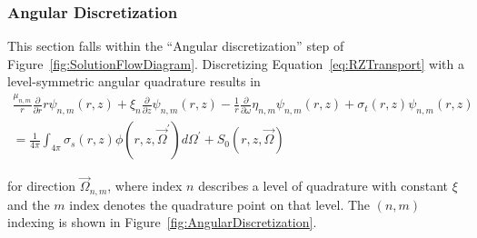 \documentclass[12pt]{article}
\begin{document}
\subsubsection{Angular Discretization}
\label{sec:RZAngularDiscretization}
This section falls within the ``Angular discretization'' step of Figure~\ref{fig:SolutionFlowDiagram}. Discretizing Equation~\ref{eq:RZTransport} with a level-symmetric angular quadrature results in 
\begin{multline}
\frac{\mu_{n,m}}{r} \frac{\partial}{\partial r} r \psi_{n,m} \left(r,z \right) + \xi_n \frac{\partial}{\partial z} \psi_{n,m} \left(r,z \right) - \frac{1}{r} \frac{\partial}{\partial \omega} \eta_{n,m} \psi_{n,m} \left(r,z \right) + \sigma_t \left(r,z \right) \psi_{n,m} \left(r,z \right) \\
= \frac{1}{4 \pi} \int_{4 \pi} \sigma_s \left(r,z \right) \phi \left(r,z, \vec{\Omega}^\prime \right) d \Omega^\prime + S_0 \left(r,z, \vec{\Omega} \right)
\label{eq:RZSNTransport}
\end{multline}

\noindent for direction $\vec{\Omega}_{n,m}$, where index $n$ describes a level of quadrature with constant $\xi$ and the $m$ index denotes the quadrature point on that level. The $(n,m)$ indexing is shown in Figure~\ref{fig:AngularDiscretization}.
\end{document}
